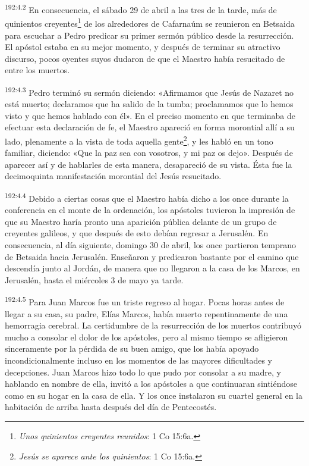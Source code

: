\par 
\textsuperscript{192:4.2} En consecuencia, el sábado 29 de abril a las tres de la tarde, más de quinientos creyentes\footnote{\textit{Unos quinientos creyentes reunidos}: 1 Co 15:6a.} de los alrededores de Cafarnaúm se reunieron en Betsaida para escuchar a Pedro predicar su primer sermón público desde la resurrección. El apóstol estaba en su mejor momento, y después de terminar su atractivo discurso, pocos oyentes suyos dudaron de que el Maestro había resucitado de entre los muertos.

\par 
\textsuperscript{192:4.3} Pedro terminó su sermón diciendo: «Afirmamos que Jesús de Nazaret no está muerto; declaramos que ha salido de la tumba; proclamamos que lo hemos visto y que hemos hablado con él». En el preciso momento en que terminaba de efectuar esta declaración de fe, el Maestro apareció en forma morontial allí a su lado, plenamente a la vista de toda aquella gente\footnote{\textit{Jesús se aparece ante los quinientos}: 1 Co 15:6a.}, y les habló en un tono familiar, diciendo: «Que la paz sea con vosotros, y mi paz os dejo». Después de aparecer así y de hablarles de esta manera, desapareció de su vista. Ésta fue la decimoquinta manifestación morontial del Jesús resucitado.

\par 
\textsuperscript{192:4.4} Debido a ciertas cosas que el Maestro había dicho a los once durante la conferencia en el monte de la ordenación, los apóstoles tuvieron la impresión de que su Maestro haría pronto una aparición pública delante de un grupo de creyentes galileos, y que después de esto debían regresar a Jerusalén. En consecuencia, al día siguiente, domingo 30 de abril, los once partieron temprano de Betsaida hacia Jerusalén. Enseñaron y predicaron bastante por el camino que descendía junto al Jordán, de manera que no llegaron a la casa de los Marcos, en Jerusalén, hasta el miércoles 3 de mayo ya tarde.

\par 
\textsuperscript{192:4.5} Para Juan Marcos fue un triste regreso al hogar. Pocas horas antes de llegar a su casa, su padre, Elías Marcos, había muerto repentinamente de una hemorragia cerebral. La certidumbre de la resurrección de los muertos contribuyó mucho a consolar el dolor de los apóstoles, pero al mismo tiempo se afligieron sinceramente por la pérdida de su buen amigo, que los había apoyado incondicionalmente incluso en los momentos de las mayores dificultades y decepciones. Juan Marcos hizo todo lo que pudo por consolar a su madre, y hablando en nombre de ella, invitó a los apóstoles a que continuaran sintiéndose como en su hogar en la casa de ella. Y los once instalaron su cuartel general en la habitación de arriba hasta después del día de Pentecostés.

